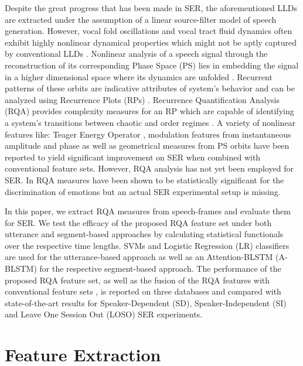 \documentclass[a4paper]{article}
\begin{document}
Despite the great progress that has been made in SER, the aforementioned LLDs are extracted under the assumption of a linear source-filter model of speech generation. However, vocal fold oscillations and vocal tract fluid dynamics often exhibit highly nonlinear dynamical properties which might not be aptly captured by conventional LLDs  \cite{herzel1993bifurcations}. Nonlinear analysis of a speech signal through the reconstruction of its corresponding Phase Space (PS) lies in embedding the signal in a higher dimensional space where its dynamics are unfolded \cite{pitsikalis2009analysis}. Recurrent patterns of these orbits are indicative attributes of system's behavior and can be analyzed using Recurrence Plots (RPs) \cite{RPsfirst1987}. Recurrence Quantification Analysis (RQA) provides complexity measures for an RP which are capable of identifying a system's transitions between chaotic and order regimes \cite{marwan2007recurrenceAll}. A variety of nonlinear features like: Teager Energy Operator \cite{TEOsun2011}, modulation features from instantaneous amplitude and phase \cite{traliarismaragos} as well as geometrical measures from PS orbits \cite{MeasuresonRPS2015speech} have been reported to yield significant improvement on SER when combined with conventional feature sets. However, RQA analysis has not yet been employed for SER. In \cite{SER_RQA_2016exploring} RQA measures have been shown to be statistically significant for the discrimination of emotions but an actual SER experimental setup is missing.

In this paper, we extract RQA measures from speech-frames and evaluate them for SER. We test the efficacy of the proposed RQA feature set under both utterance and segment-based approaches by calculating statistical functionals over the respective time lengths. SVMs and Logistic Regression (LR) classifiers are used for the utterance-based approach as well as an Attention-BLSTM (A-BLSTM) for the respective segment-based approach. The performance of the proposed RQA feature set, as well as the fusion of the RQA features with conventional feature sets \cite{schuller2010interspeech},  is reported on three databases and compared with state-of-the-art results for Speaker-Dependent (SD), Speaker-Independent (SI) and Leave One Session Out (LOSO) SER experiments. 




\section{Feature Extraction}
\label{sect:FeatureExtraction}
\end{document}
